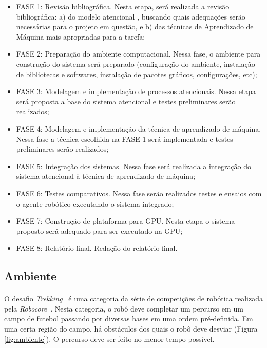 \documentclass[11pt]{article}
\newcommand{\tit}[1]{\textit{#1}}
\begin{document}
\begin{itemize}
	\item FASE  1:  Revisão  bibliográfica. Nesta etapa, será realizada a 
		revisão bibliográfica:  a) do  modelo  atencional \cite{esther}, 
		buscando quais adequações serão necessárias para o projeto em questão, 
		e b) das técnicas de Aprendizado de Máquina mais 
		apropriadas para a tarefa;
	\item FASE  2: Preparação do ambiente computacional. 
		Nessa fase, o ambiente para construção do sistema será preparado 
		(configuração do ambiente, instalação de bibliotecas e softwares, 
		instalação de pacotes gráficos, configurações, etc); 
	\item FASE  3:  Modelagem e implementação de processos atencionais.  
		Nessa  etapa  será proposta a base do sistema  atencional e testes 
		preliminares serão realizados;
	\item FASE  4:  Modelagem e implementação da técnica de aprendizado de 
		máquina.  
		Nessa  fase  a  técnica escolhida na FASE 1 será implementada e 
		testes preliminares serão realizados; 
	\item FASE  5:  Integração dos sistemas.
		Nessa fase será realizada a integração do sistema atencional à técnica 
		de aprendizado de máquina;
	\item FASE  6:  Testes comparativos. 
		Nessa fase serão realizados testes  e  ensaios  com  o  agente  
		robótico executando o sistema integrado;
	\item FASE  7:  Construção de plataforma para GPU. 
		Nesta etapa o sistema proposto será adequado para ser executado na GPU;
	\item FASE  8:  Relatório final. 
		Redação do relatório final.
\end{itemize}

\subsection{Ambiente}
\paragraph{}
O desafio \tit{Trekking}~\cite{trekking_regras} é uma categoria da série de 
competições de robótica realizada pela \tit{Robocore}~\cite{robocore}. 
Nesta categoria, o robô deve completar um percurso em 
um campo de futebol passando por diversas bases em uma ordem pré-definida.
Em uma certa região do campo, há obstáculos dos quais o robô deve desviar 
(Figura \ref{fig:ambiente}).  
O percurso deve ser feito no menor tempo possível.
\end{document}
